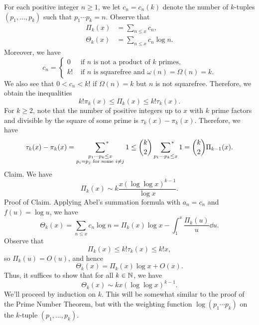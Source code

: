 \begin{pf}
    For each positive integer $n \geq 1$, we let $c_n = c_n(k)$ denote the number 
    of $k$-tuples $(p_1, \dots, p_k)$ such that $p_1 \cdots p_k = n$. 
    Observe that 
    \begin{align*}
        \Pi_k(x) &= \sum_{n\leq x} c_n, \\ 
        \Theta_k(x) &= \sum_{n\leq x} c_n \log n.
    \end{align*}
    Moreover, we have 
    \[ c_n = \begin{cases} 
        0 & \text{ if $n$ is not a product of $k$ primes,} \\
        k! & \text{ if $n$ is squarefree and $\omega(n) = \Omega(n) = k$.} 
    \end{cases} \] 
    We also see that $0 < c_n < k!$ if $\Omega(n) = k$ but $n$ is not squarefree. 
    Therefore, we obtain the inequalities 
    \[ k!\pi_k(x) \leq \Pi_k(x) \leq k!\tau_k(x). \tag{4.1}\label{eq:4.1} \] 
    For $k \geq 2$, note that the number of positive integers up to $x$ with 
    $k$ prime factors and divisible by the square of some prime is 
    $\tau_k(x) - \pi_k(x)$. Therefore, we have 
    \[ \tau_k(x) - \pi_k(x) = 
    \sum_{\substack{p_1\cdots p_k \leq x \\ p_i = p_j \text{ for some } i \neq j}}
    {\vphantom{\sum}}^{\hspace{-6.5ex}*} \hspace{5.5ex} 1 
    \leq \binom{k}{2} \sum_{p_1\cdots p_k \leq x}
    {\vphantom{\sum}}^{\hspace{-2.5ex}*} \hspace{1.5ex} 1 
    = \binom{k}{2} \Pi_{k-1}(x). \]
    {\sc Claim.} We have 
    \[ \Pi_k(x) \sim k \frac{x(\log \log x)^{k-1}}{\log x}. \] 
    {\sc Proof of Claim.} Applying Abel's summation formula with $a_n = c_n$ 
    and $f(u) = \log u$, we have 
    \[ \Theta_k(x) = \sum_{n \leq x} c_n \log n = \Pi_k(x) \log x 
    - \int_1^x \frac{\Pi_k(u)}{u}\dd u. \] 
    Observe that 
    \[ \Pi_k(x) \leq k!\tau_k(x) \leq k!x, \] 
    so $\Pi_k(u) = O(u)$, and hence 
    \[ \Theta_k(x) = \Pi_k(x) \log x + O(x). \] 
    Thus, it suffices to show that for all $k \in \mathbb{N}$, we have 
    \[ \Theta_k(x) \sim kx(\log \log x)^{k-1}. \tag{4.2}\label{eq:4.2} \] 
    We'll proceed by induction on $k$. This will be somewhat similar to the 
    proof of the Prime Number Theorem, but with the weighting function 
    $\log(p_1 \cdots p_k)$ on the $k$-tuple $(p_1, \dots, p_k)$. 


\end{pf}
